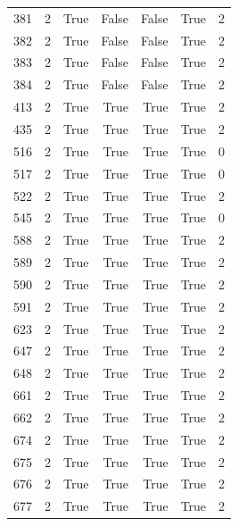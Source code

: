 \begin{tabular}{rrrrrrr}
381 & 2 & True & False & False & True & 2 \\
382 & 2 & True & False & False & True & 2 \\
383 & 2 & True & False & False & True & 2 \\
384 & 2 & True & False & False & True & 2 \\
413 & 2 & True & True & True & True & 2 \\
435 & 2 & True & True & True & True & 2 \\
516 & 2 & True & True & True & True & 0 \\
517 & 2 & True & True & True & True & 0 \\
522 & 2 & True & True & True & True & 2 \\
545 & 2 & True & True & True & True & 0 \\
588 & 2 & True & True & True & True & 2 \\
589 & 2 & True & True & True & True & 2 \\
590 & 2 & True & True & True & True & 2 \\
591 & 2 & True & True & True & True & 2 \\
623 & 2 & True & True & True & True & 2 \\
647 & 2 & True & True & True & True & 2 \\
648 & 2 & True & True & True & True & 2 \\
661 & 2 & True & True & True & True & 2 \\
662 & 2 & True & True & True & True & 2 \\
674 & 2 & True & True & True & True & 2 \\
675 & 2 & True & True & True & True & 2 \\
676 & 2 & True & True & True & True & 2 \\
677 & 2 & True & True & True & True & 2 \\
\bottomrule
\end{tabular}
